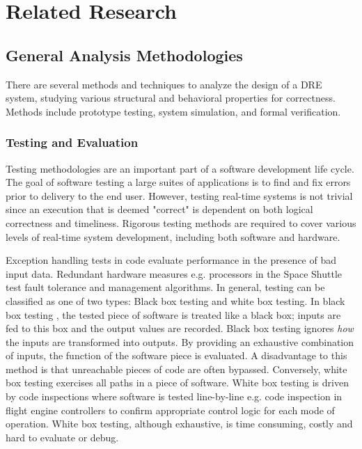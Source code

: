 \chapter{Related Research}
\label{chapter:related-research}

\section{General Analysis Methodologies}

There are several methods and techniques to analyze the design of a DRE system, studying various structural and behavioral properties for correctness. Methods include prototype testing, system simulation, and formal verification. 

\subsection{Testing and Evaluation}

Testing methodologies are an important part of a software development life cycle. The goal of software testing a large suites of applications is to find and fix errors prior to delivery to the end user. However, testing real-time systems is not trivial since an execution that is deemed "correct" is dependent on both logical correctness and timeliness. Rigorous testing methods are required to cover various levels of real-time system development, including both software and hardware. 

Exception handling \cite{goodenough1975exception} tests in code evaluate performance in the presence of bad input data. Redundant hardware measures e.g. processors in the Space Shuttle \cite{sklaroff1976redundancy} test fault tolerance and management algorithms. In general, testing can be classified as one of two types: Black box testing and white box testing. In black box testing \cite{krichen2004black}, the tested piece of software is treated like a black box; inputs are fed to this box and the output values are recorded. Black box testing ignores \emph{how} the inputs are transformed into outputs. By providing an exhaustive combination of inputs, the function of the software piece is evaluated. A disadvantage to this method is that unreachable pieces of code are often bypassed. Conversely, white box testing exercises all paths in a piece of software. White box testing is driven by code inspections where software is tested line-by-line e.g. code inspection in flight engine controllers to confirm appropriate control logic for each mode of operation. White box testing, although exhaustive, is time consuming, costly and hard to evaluate or debug. 

